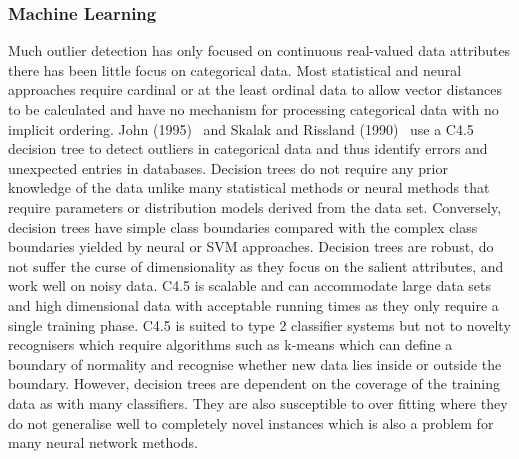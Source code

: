 \subsubsection{Machine Learning}
Much outlier detection has only focused on continuous real-valued data attributes there has been little focus on categorical data. Most statistical and neural approaches require cardinal or at the least ordinal data to allow vector distances to be calculated and have no mechanism for processing categorical data with no implicit ordering. John (1995)~\cite{ref_f1} and Skalak and Rissland (1990) ~\cite{ref_g1}use a C4.5 decision tree to detect outliers in categorical data and thus identify errors and unexpected entries in databases. Decision trees do not require any prior knowledge of the data unlike many statistical methods or neural methods that require parameters or distribution models derived from the data set. Conversely, decision trees have simple class boundaries compared with the complex class boundaries yielded by neural or SVM approaches. Decision trees are robust, do not suffer the curse of dimensionality as they focus on the salient attributes, and work well on noisy data. C4.5 is scalable and can accommodate large data sets and high dimensional data with acceptable running times as they only require a single training phase. C4.5 is suited to type 2 classifier systems but not to novelty recognisers which require algorithms such as k-means which can define a boundary of normality and recognise whether new data lies inside or outside the boundary. However, decision trees are dependent on the coverage of the training data as with many classifiers. They are also susceptible to over fitting where they do not generalise well to completely novel instances which is also a problem for many neural network methods. 

